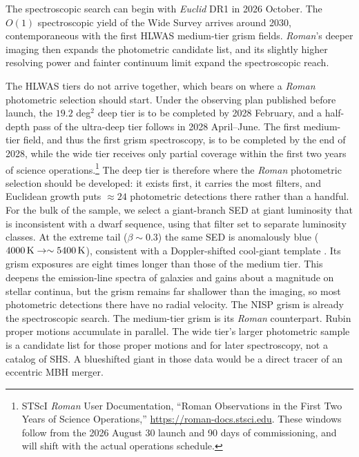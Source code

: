 \documentclass[twocolumn]{aastex701}
\begin{document}
The spectroscopic search can begin with \textit{Euclid} DR1 in 2026 October.
The $O(1)$ spectroscopic yield of the Wide Survey arrives around 2030, contemporaneous with the
first HLWAS medium-tier grism fields. \textit{Roman}'s deeper imaging then
expands the photometric candidate list, and its slightly higher resolving
power and fainter continuum limit expand the spectroscopic reach.

The HLWAS tiers do not arrive together, which bears on where a
\textit{Roman} photometric selection should start. Under the observing plan published before launch, the
$19.2$ deg$^{2}$ deep tier is to be completed by 2028 February, and a half-depth
pass of the ultra-deep tier follows in 2028 April--June. The first
medium-tier field, and thus the first grism spectroscopy, is to be completed by the
end of 2028, while the wide tier receives only partial coverage within the
first two years of science
operations.\footnote{STScI \textit{Roman} User Documentation, ``Roman
Observations in the First Two Years of Science Operations,''
\url{https://roman-docs.stsci.edu}. These windows follow from the 2026 August 30 launch
and 90 days of commissioning, and will shift with the actual operations schedule.}
The deep tier is therefore where the \textit{Roman} photometric selection
should be developed:
it exists first, it carries the most filters, and Euclidean growth puts
$\approx24$ photometric detections there rather than a handful. For the
bulk of the sample, we select a giant-branch SED at giant luminosity that is
inconsistent with a dwarf sequence, using that filter set to separate
luminosity classes. At the extreme tail ($\beta\sim0.3$) the same SED is anomalously blue
($4000\,{\rm K}\rightarrow\sim5400\,{\rm K}$), consistent with a
Doppler-shifted cool-giant template
\citep[][their \S6.1]{gl15}. Its grism exposures are eight
times longer than those of the medium tier. This deepens the emission-line
spectra of galaxies and gains about a magnitude on stellar continua, but the
grism remains far shallower than the imaging, so most photometric detections there have no radial velocity. The
NISP grism is already the spectroscopic search. The medium-tier grism is its
\textit{Roman} counterpart. Rubin proper motions accumulate in parallel. The
wide tier's larger photometric sample is a candidate list for those proper
motions and for later spectroscopy, not a catalog of SHS.
A blueshifted giant in those data would be a direct tracer of an eccentric
MBH merger.
\end{document}
